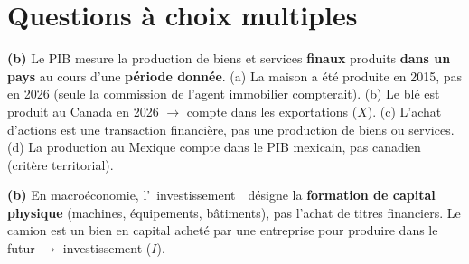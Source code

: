 




\section{Questions à choix multiples}

\setcounter{qcmcounter}{0}


\begin{reponse}
\textbf{(b)} Le PIB mesure la production de biens et services \textbf{finaux} produits \textbf{dans un pays} au cours d'une \textbf{période donnée}. (a) La maison a été produite en 2015, pas en 2026 (seule la commission de l'agent immobilier compterait). (b) Le blé est produit au Canada en 2026 $\to$ compte dans les exportations ($X$). (c) L'achat d'actions est une transaction financière, pas une production de biens ou services. (d) La production au Mexique compte dans le PIB mexicain, pas canadien (critère territorial).
\end{reponse}


\begin{reponse}
\textbf{(b)} En macroéconomie, l'\guillemotleft~investissement~\guillemotright\ désigne la \textbf{formation de capital physique} (machines, équipements, bâtiments), pas l'achat de titres financiers. Le camion est un bien en capital acheté par une entreprise pour produire dans le futur $\to$ investissement ($I$).
\end{reponse}

